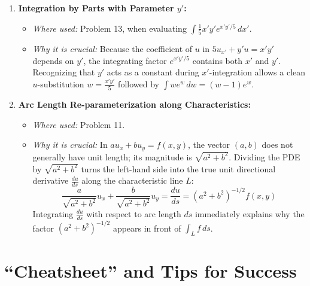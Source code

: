 \documentclass[11pt]{article}
\begin{document}
\begin{enumerate}
    \item \textbf{Integration by Parts with Parameter $y'$:}
    \begin{itemize}
        \item \emph{Where used:} Problem 13, when evaluating $\int \frac{1}{5}x'y'e^{x'y'/5}\,dx'$.
        \item \emph{Why it is crucial:} Because the coefficient of $u$ in $5u_{x'} + y'u = x'y'$ depends on $y'$, the integrating factor $e^{x'y'/5}$ contains both $x'$ and $y'$. Recognizing that $y'$ acts as a constant during $x'$-integration allows a clean $u$-substitution $w = \frac{x'y'}{5}$ followed by $\int w e^w\,dw = (w - 1)e^w$.
    \end{itemize}

    \item \textbf{Arc Length Re-parameterization along Characteristics:}
    \begin{itemize}
        \item \emph{Where used:} Problem 11.
        \item \emph{Why it is crucial:} In $au_x + bu_y = f(x, y)$, the vector $(a, b)$ does not generally have unit length; its magnitude is $\sqrt{a^2 + b^2}$. Dividing the PDE by $\sqrt{a^2 + b^2}$ turns the left-hand side into the true unit directional derivative $\frac{du}{ds}$ along the characteristic line $L$:
        \[
        \frac{a}{\sqrt{a^2+b^2}}u_x + \frac{b}{\sqrt{a^2+b^2}}u_y = \frac{du}{ds} = (a^2 + b^2)^{-1/2}f(x, y)
        \]
        Integrating $\frac{du}{ds}$ with respect to arc length $ds$ immediately explains why the factor $(a^2 + b^2)^{-1/2}$ appears in front of $\int_L f\,ds$.
    \end{itemize}
\end{enumerate}

\newpage
\section{``Cheatsheet'' and Tips for Success}
\end{document}
